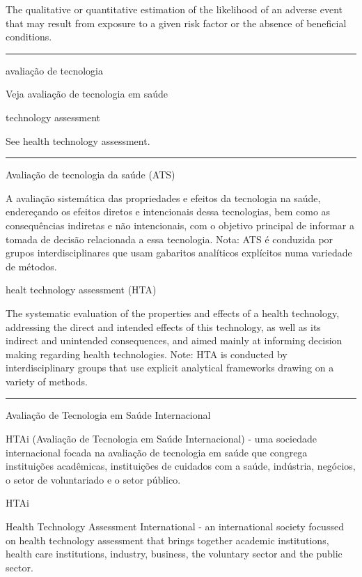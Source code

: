 \documentclass[
]{book}
\begin{document}
The qualitative or quantitative estimation of the likelihood of an adverse event that may result from exposure to a given risk factor or the absence of beneficial conditions.

\begin{center}\rule{0.5\linewidth}{0.5pt}\end{center}

avaliação de tecnologia

Veja avaliação de tecnologia em saúde

technology assessment

See health technology assessment.

\begin{center}\rule{0.5\linewidth}{0.5pt}\end{center}

Avaliação de tecnologia da saúde (ATS)

A avaliação sistemática das propriedades e efeitos da tecnologia na saúde, endereçando os efeitos diretos e intencionais dessa tecnologias, bem como as consequências indiretas e não intencionais, com o objetivo principal de informar a tomada de decisão relacionada a essa tecnologia. Nota: ATS é conduzida por grupos interdisciplinares que usam gabaritos analíticos explícitos numa variedade de métodos.

healt technology assessment (HTA)

The systematic evaluation of the properties and effects of a health technology, addressing the direct and intended effects of this technology, as well as its indirect and unintended consequences, and aimed mainly at informing decision making regarding health technologies. Note: HTA is conducted by interdisciplinary groups that use explicit analytical frameworks drawing on a variety of methods.

\begin{center}\rule{0.5\linewidth}{0.5pt}\end{center}

Avaliação de Tecnologia em Saúde Internacional

HTAi (Avaliação de Tecnologia em Saúde Internacional) - uma sociedade internacional focada na avaliação de tecnologia em saúde que congrega instituições acadêmicas, instituições de cuidados com a saúde, indústria, negócios, o setor de voluntariado e o setor público.

HTAi

Health Technology Assessment International - an international society focussed on health technology assessment that brings together academic institutions, health care institutions, industry, business, the voluntary sector and the public sector.
\end{document}
